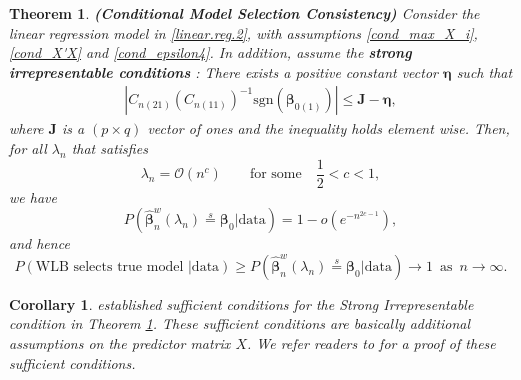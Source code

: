 \documentclass[12pt]{article}
\newcommand{\bnw}{\widehat{\bm{\beta}}_n^w} %
\newcommand{\be}{\bm{\beta}} %
\newtheorem{thm}{Theorem}[section]
\newtheorem{corollary}{Corollary}[thm]
\begin{document}
\begin{thm} \label{model.select.consistent}
	\textbf{(Conditional Model Selection Consistency)} Consider the linear regression model in \eqref{linear.reg.2}, with assumptions \eqref{cond_max_X_i}, \eqref{cond_X'X} and \eqref{cond_epsilon4}. In addition, assume the \textbf{strong irrepresentable conditions} \citep{BinYu}: There exists a positive constant vector $\bm{\eta}$ such that 
	\begin{align} \label{strongirrepresent}
		\left|
			C_{n(21)} 
			\left( C_{n(11)} \right)^{-1} 
			\text{sgn} \left( \be_{0(1)} \right)
		\right| \leq
		\bm{J} - \bm{\eta},
	\end{align}
	where $\bm{J}$ is a $(p \times q)$ vector of ones and the inequality holds element wise. Then, for all $\lambda_n$ that satisfies 
		$$
		 \lambda_n = \mathcal{O} (n^c)
		 \qquad \text{for some} \quad
		 \frac{1}{2} < c < 1,
		$$
	we have
		$$
		P\left(
			\bnw (\lambda_n) \stackrel{s}{=} \be_0
			\bigg| \text{data}
		\right)	
		= 1 - o\left(e ^ {-n ^ { 2c - 1 } }\right), 
		$$ 
	and hence
		$$
		P \left(
				\text{WLB selects true model }
				\big| \text{data}
			\right)
		\geq 
		P\left( 
			\bnw (\lambda_n) \stackrel{s}{=} \be_0
			\bigg| \text{data}
		 \right)
		 \to 1 \,\,\, \text{as} \,\,\, n \to \infty.		
		$$ 
\end{thm} 

\begin{corollary}
	\citet{BinYu} established sufficient conditions for the Strong Irrepresentable condition in Theorem \ref{model.select.consistent}. These sufficient conditions are basically additional assumptions on the predictor matrix $X$. We refer readers to \citet{BinYu} for a proof of these sufficient conditions. 
\end{corollary}
\end{document}
